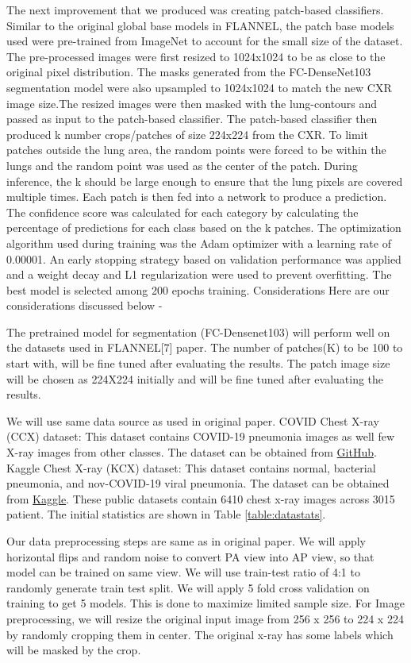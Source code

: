 \documentclass{sigkddExp}
\begin{document}
The next improvement that we produced was creating patch-based classifiers.
Similar to the original global base models in FLANNEL, the patch base models
used were pre-trained from ImageNet to account for the small size of the
dataset. The pre-processed images were first resized to 1024x1024 to be as close
to the original pixel distribution. The masks generated from the FC-DenseNet103
segmentation model were also upsampled to 1024x1024 to match the new CXR image
size.The resized images were then masked with the lung-contours and passed as
input to the patch-based classifier. The patch-based classifier then produced k
number crops/patches of size 224x224 from the CXR. To limit patches outside the
lung area, the random points were forced to be within the lungs and the random
point was used as the center of the patch. During inference, the k should be
large enough to ensure that the lung pixels are covered multiple times. Each
patch is then fed into a network to produce a prediction. The confidence score
was calculated for each category by calculating the percentage of predictions
for each class based on the k patches. The optimization algorithm used during
training was the Adam optimizer with a learning rate of 0.00001. An early
stopping strategy based on validation performance was applied and a weight decay
and L1 regularization were used to prevent overfitting. The best model is
selected among 200 epochs training. Considerations Here are our considerations
discussed below -

The pretrained model for segmentation (FC-Densenet103) will perform well on the
datasets used in FLANNEL[7] paper. The number of patches(K) to be 100 to start
with, will be fine tuned after evaluating the results. The patch image size will
be chosen as 224X224 initially and will be fine tuned after evaluating the
results.


We will use same data source as used in original paper. COVID Chest X-ray
(CCX) dataset: This dataset contains COVID-19 pneumonia images as well few X-ray
images from other classes. The dataset can be obtained from
\href{https://github.com/ieee8023/covid-chestxray-dataset}{GitHub}.
Kaggle Chest X-ray (KCX) dataset: This dataset contains normal, bacterial
pneumonia, and nov-COVID-19 viral pneumonia. The dataset can be
obtained from \href{https://www.kaggle.com/paultimothymooney/chest-xray-pneumonia}{Kaggle}.
These public datasets contain 6410 chest x-ray images across 3015 patient. The initial
statistics are shown in Table \ref{table:datastats}.

Our data preprocessing steps are same as in original paper. We will apply
horizontal flips and random noise to convert PA view into AP view, so that model
can be trained on same view. We will use train-test ratio of 4:1 to randomly
generate train test split. We will apply 5 fold cross validation on training to
get 5 models. This is done to maximize limited sample size. For Image
preprocessing, we will resize the original input image from 256 x 256 to 224 x
224 by randomly cropping them in center. The original x-ray has some labels
which will be masked by the crop.
\end{document}
